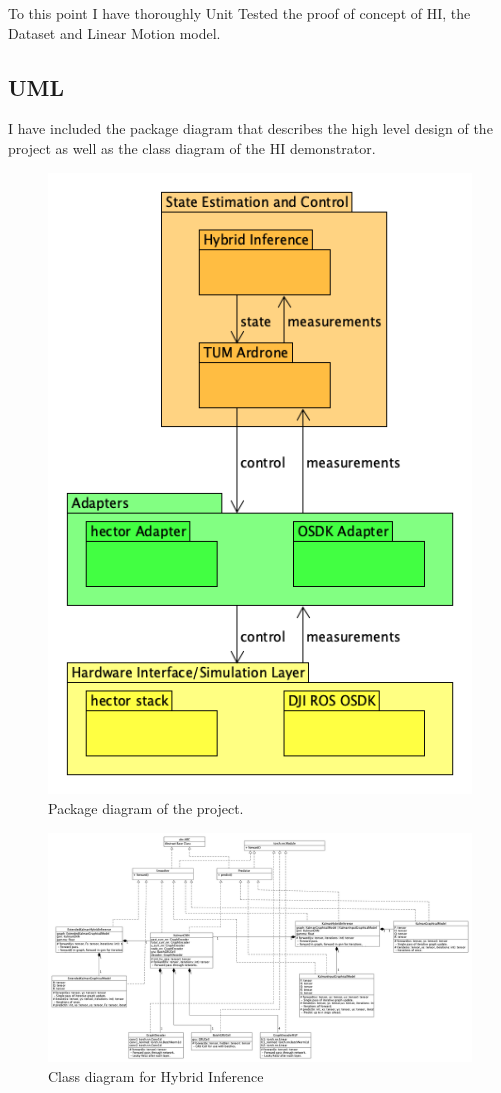 \documentclass[]{../resources/final_report}
\begin{document}
To this point I have thoroughly Unit Tested the proof of concept of HI, the 
Dataset and Linear Motion model.

\pagebreak
\subsection{UML}
I have included the package diagram that describes the high level design 
of the project as well as the class diagram of the HI demonstrator.

\begin{figure}[h]
  \centering
  \includegraphics[height=0.30\textheight]{hybrid-inference-package-uml.png}  
  \caption{Package diagram of the project.}
  \label{}
\end{figure}


\begin{figure}[h]
  \centering
  \includegraphics[height=0.36\textheight]{hybrid-inference-uml.png}
  \caption{Class diagram for Hybrid Inference}
  \label{}
\end{figure}
\end{document}
